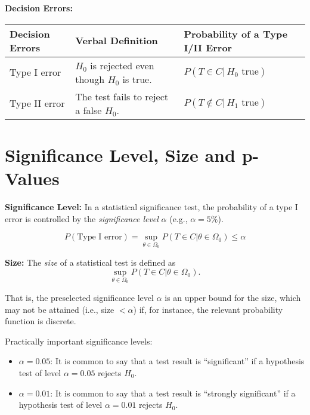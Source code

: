 \documentclass[
]{book}
\providecommand{\tightlist}{%
  \setlength{\itemsep}{0pt}\setlength{\parskip}{0pt}}
\begin{document}
\hfill\break

\textbf{Decision Errors:}

\begin{longtable}[]{@{}lll@{}}
\toprule
Decision Errors & Verbal Definition & Probability of a Type I/II Error \\
\midrule
\endhead
Type I error & \(H_0\) is rejected even though \(H_0\) is true. & \(P(T\in C |\,H_0\text{ true})\) \\
Type II error & The test fails to reject a false \(H_0\). & \(P(T\not\in C |\,H_1\text{ true})\) \\
\bottomrule
\end{longtable}

\hypertarget{significance-level-size-and-p-values}{%
\section{Significance Level, Size and p-Values}\label{significance-level-size-and-p-values}}

\textbf{Significance Level:}
In a statistical significance test, the probability of a type I error is controlled by the \emph{significance level} \(\alpha\) (e.g., \(\alpha=5\%\)).

\[P\left(\text{Type I error}\right)=\sup_{\theta\in\Omega_0} P(T\in C|\theta\in\Omega_0)\leq \alpha\]

\hfill\break

\textbf{Size:}
The \emph{size} of a statistical test is defined as
\[\sup_{\theta\in\Omega_0} P(T\in C|\theta\in\Omega_0).\]

That is, the preselected significance level \(\alpha\) is an upper bound for the size, which may not be attained (i.e., size \(<\alpha\)) if, for instance, the relevant probability function is discrete.

\hfill\break

Practically important significance levels:

\begin{itemize}
\tightlist
\item
  \(\alpha=0.05\): It is common to say that a test result is ``significant'' if a hypothesis test of level \(\alpha=0.05\) rejects \(H_0\).
\item
  \(\alpha=0.01\): It is common to say that a test result is ``strongly significant'' if a hypothesis test of level \(\alpha=0.01\) rejects \(H_0\).
\end{itemize}

\hfill\break
\end{document}
